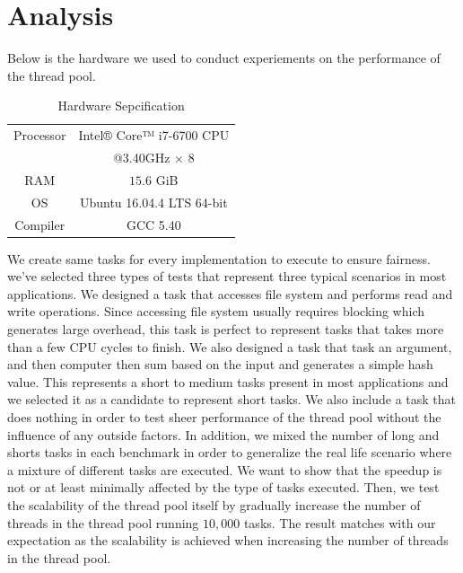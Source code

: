 \documentclass[journal, a4paper]{IEEEtran}
\begin{document}
\section{Analysis}
Below is the hardware we used to conduct experiements on the performance of the thread pool.
	\begin{table}[!hbt]
	\begin{center}
		\caption{Hardware Sepcification}
		\label{tab:simParameters}
		\begin{tabular}{|c|c|}
			\hline
			Processor & Intel® Core™ i7-6700 CPU \\
								&@3.40GHz $\times$ 8\\
			\hline
			RAM & $15.6$ GiB \\
			\hline
			OS & Ubuntu 16.04.4 LTS 64-bit\\
			\hline
			Compiler & GCC 5.40\\
			\hline
		\end{tabular}
		\end{center}
	\end{table}

We create same tasks for every implementation to execute to ensure fairness. we've selected three types of tests that represent three typical scenarios in most applications. We designed a task that accesses file system and performs read and write operations. Since accessing file system usually requires blocking which generates large overhead, this task is perfect to represent tasks that takes more than a few CPU cycles to finish. We also designed a task that task an argument, and then computer then sum based on the input and generates a simple hash value. This represents a short to medium tasks present in most applications and we selected it as a candidate to represent short tasks. We also include a task that does nothing in order to test sheer performance of the thread pool without the influence of any outside factors. In addition, we mixed the number of long and shorts tasks in each benchmark in order to generalize the real life scenario where a mixture of different tasks are executed. We want to show that the speedup is not or at least minimally affected by the type of tasks executed. Then, we test the scalability of the thread pool itself by gradually increase the number of threads in the thread pool running $10,000$ tasks. The result matches with our expectation as the scalability is achieved when increasing the number of threads in the thread pool.\\
\end{document}
